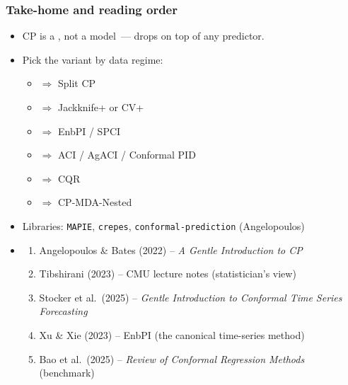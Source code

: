 \documentclass[11pt, aspectratio=169, xcolor={dvipsnames}, usepdftitle=false]{beamer}
\begin{document}
\begin{frame}
\frametitle{Take-home and reading order}
\begin{itemize}
\item CP is a , not a model~--- drops on top of any predictor.
\item Pick the variant by data regime:
\begin{itemize}
\item {} $\Rightarrow$ Split CP
\item {} $\Rightarrow$ Jackknife+ or CV+
\item {} $\Rightarrow$ EnbPI / SPCI
\item {} $\Rightarrow$ ACI / AgACI / Conformal PID
\item {} $\Rightarrow$ CQR
\item {} $\Rightarrow$ CP-MDA-Nested
\end{itemize}
\item Libraries: \texttt{MAPIE}, \texttt{crepes}, \texttt{conformal-prediction} (Angelopoulos)
\item {}
\begin{enumerate}
\item Angelopoulos \& Bates (2022) -- \emph{A Gentle Introduction to CP}
\item Tibshirani (2023) -- CMU lecture notes (statistician's view)
\item Stocker et al.\ (2025) -- \emph{Gentle Introduction to Conformal Time Series Forecasting}
\item Xu \& Xie (2023) -- EnbPI (the canonical time-series method)
\item Bao et al.\ (2025) -- \emph{Review of Conformal Regression Methods} (benchmark)
\end{enumerate}
\end{itemize}
\end{frame}
\end{document}
